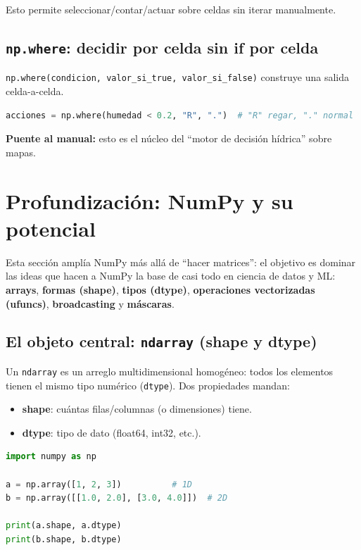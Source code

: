 \documentclass[11pt, a4paper]{article}
\begin{document}
Esto permite seleccionar/contar/actuar sobre celdas sin iterar manualmente.

\subsection{\texttt{np.where}: decidir por celda sin if por celda}
\texttt{np.where(condicion, valor\_si\_true, valor\_si\_false)} construye una salida celda-a-celda.

\begin{lstlisting}[language=Python, caption={np.where como motor de decisiones}]
acciones = np.where(humedad < 0.2, "R", ".")  # "R" regar, "." normal
\end{lstlisting}

\textbf{Puente al manual:} esto es el núcleo del “motor de decisión hídrica” sobre mapas.
\newpage
\section{Profundización: NumPy y su potencial}

Esta sección amplía NumPy más allá de ``hacer matrices'': el objetivo es dominar las ideas que hacen a NumPy la base de casi todo en ciencia de datos y ML: \textbf{arrays}, \textbf{formas (shape)}, \textbf{tipos (dtype)}, \textbf{operaciones vectorizadas (ufuncs)}, \textbf{broadcasting} y \textbf{máscaras}.

\subsection{El objeto central: \texttt{ndarray} (shape y dtype)}
Un \texttt{ndarray} es un arreglo multidimensional homogéneo: todos los elementos tienen el mismo tipo numérico (\texttt{dtype}).
Dos propiedades mandan:
\begin{itemize}
\item \textbf{shape}: cuántas filas/columnas (o dimensiones) tiene.
\item \textbf{dtype}: tipo de dato (float64, int32, etc.).
\end{itemize}

\begin{lstlisting}[language=Python, caption={Crear arrays y observar shape/dtype}]
import numpy as np

a = np.array([1, 2, 3])          # 1D
b = np.array([[1.0, 2.0], [3.0, 4.0]])  # 2D

print(a.shape, a.dtype)
print(b.shape, b.dtype)
\end{lstlisting}
\end{document}
